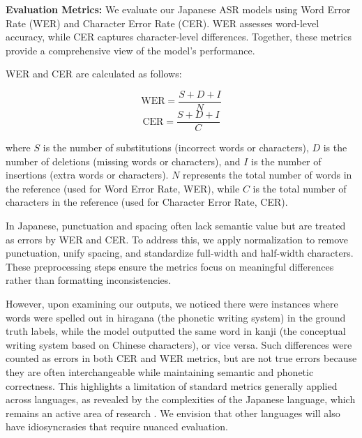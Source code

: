 \documentclass[10pt,twocolumn,letterpaper]{article}
\begin{document}
\textbf{Evaluation Metrics:}
We evaluate our Japanese ASR models using Word Error Rate (WER) and Character Error Rate (CER). WER assesses word-level accuracy, while CER captures character-level differences. Together, these metrics provide a comprehensive view of the model's performance.

WER and CER are calculated as follows:

\begin{equation}
\text{WER} = \frac{S + D + I}{N}
\end{equation}
\quad
\begin{equation}
\text{CER} = \frac{S + D + I}{C}
\end{equation}

\vspace{0.2cm}

\noindent where \(S\) is the number of substitutions (incorrect words or characters), \(D\) is the number of deletions (missing words or characters), and \(I\) is the number of insertions (extra words or characters). \(N\) represents the total number of words in the reference (used for Word Error Rate, WER), while \(C\) is the total number of characters in the reference (used for Character Error Rate, CER).




In Japanese, punctuation and spacing often lack semantic value but are treated as errors by WER and CER. To address this, we apply normalization to remove punctuation, unify spacing, and standardize full-width and half-width characters. These preprocessing steps ensure the metrics focus on meaningful differences rather than formatting inconsistencies.

However, upon examining our outputs, we noticed there were instances where words were spelled out in hiragana (the phonetic writing system) in the ground truth labels, while the model outputted the same word in kanji (the conceptual writing system based on Chinese characters), or vice versa. Such differences were counted as errors in both CER and WER metrics, but are not true errors because they are often interchangeable while maintaining semantic and phonetic correctness. This highlights a limitation of standard metrics generally applied across languages, as revealed by the complexities of the Japanese language, which remains an active area of research \cite{karitaLenientEvaluationJapanese2023}. We envision that other languages will also have idiosyncrasies that require nuanced evaluation.
\end{document}
